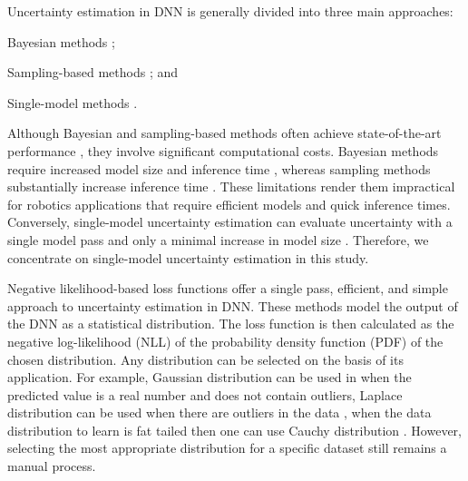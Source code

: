 \documentclass[letterpaper, 10 pt, conference]{ieeeconf}  %
\begin{document}
Uncertainty estimation in DNN is generally divided into three main approaches: 
\begin{inparaenum}
	\item Bayesian methods \cite{kendall_what_2017,dusenberry2020analyzing}; \item Sampling-based methods \cite{gal_dropout_2016, lakshminarayanan_simple_2016}; and 
	\item Single-model methods \cite{nix1994estimating} \cite{amini_deep_2019, sensoy_evidential_2018, nair_laplace_2O22}.
\end{inparaenum} Although Bayesian and sampling-based methods often achieve state-of-the-art performance \cite{dusenberry2020efficient, wen2020batchensemble}, they involve significant computational costs. Bayesian methods require increased model size and inference time \cite{blundell2015weight}, whereas sampling methods substantially increase inference time \cite{gal_dropout_2016, lakshminarayanan_simple_2016}. These limitations render them impractical for robotics applications that require efficient models and quick inference times. Conversely, single-model uncertainty estimation can evaluate uncertainty with a single model pass and only a minimal increase in model size \cite{nix1994estimating, malinin2018predictive, sensoy_evidential_2018}. Therefore, we concentrate on single-model uncertainty estimation in this study.
 
Negative likelihood-based loss functions offer a single pass, efficient, and simple approach to uncertainty estimation in DNN. These methods model the output of the DNN as a statistical distribution. The loss function is then calculated as the negative log-likelihood (NLL) of the probability density function (PDF) of the chosen distribution. Any distribution can be selected on the basis of its application. For example, Gaussian distribution\cite{nix1994estimating} can be used in when the predicted value is a real number and does not contain outliers, Laplace distribution can be used when there are outliers in the data \cite{nair_laplace_2O22}, when the data distribution to learn is fat tailed then one can use Cauchy distribution \cite{bosman2022cauchy}. However, selecting the most appropriate distribution for a specific dataset still remains a manual process.
\end{document}
